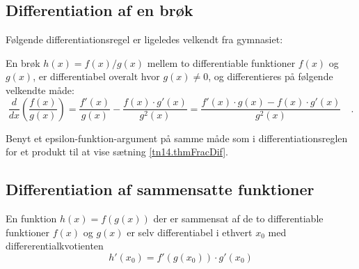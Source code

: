\subsection{Differentiation af en brøk}
Følgende differentiationsregel er ligeledes velkendt fra gymnasiet:

\begin{theorem}[Differentiation af $f(x)/g(x)$] \label{tn14.thmFracDif}
En brøk $h(x) = f(x) / g(x)$ mellem  to differentiable funktioner $f(x)$ og $g(x)$,  er differentiabel overalt hvor $g(x) \neq 0$, og differentieres på følgende velkendte måde:
\begin{equation}
\frac{d}{dx}\left( \frac{f(x)}{g(x)}\right) = \frac{f'(x)}{g(x)} - \frac{f(x) \cdot g'(x)}{g^{2}(x)}= \frac{f'(x)\cdot g(x) - f(x)\cdot g'(x)}{g^{2}(x)} \quad .
\end{equation}
\end{theorem}

\begin{exercise}
Benyt et epsilon-funktion-argument på samme måde som i differentiationsreglen for et produkt til at vise sætning \ref{tn14.thmFracDif}.
\end{exercise}





\subsection{Differentiation af sammensatte funktioner}

\begin{theorem}
En funktion $h(x) = f(g(x))$ der er sammensat af de to differentiable funktioner $f(x)$ og $g(x)$ er
selv differentiabel i ethvert $x_{0}$  med differerentialkvotienten
\begin{equation} \label{tn14.eqChain}
h'(x_{0}) = f'(g(x_{0}))\cdot g'(x_{0})
\end{equation}
\end{theorem}

